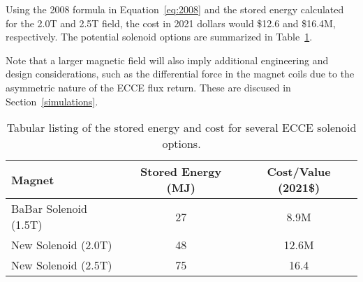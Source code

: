 Using the 2008 formula in Equation~\ref{eq:2008} and the stored energy calculated for the 2.0T and 2.5T field, the cost in 2021 dollars would \$12.6 and \$16.4M, respectively. The potential solenoid options are summarized in Table~\ref{tab:magoptions}. 

Note that a larger magnetic field will also imply additional engineering and design considerations, such as the differential force in the magnet coils due to the asymmetric nature of the ECCE flux return.  These are discused in Section~\ref{simulations}. 

\begin{table}[h!tbp]
    \centering
    \begin{tabular}{lcc}
        \hline
                     Magnet    & Stored Energy (MJ) &  Cost/Value (2021\$) \\ [0.5ex]
         \hline
         BaBar Solenoid (1.5T) & 27 & 8.9M \\       
         New Solenoid (2.0T)   & 48 & 12.6M \\
         New Solenoid (2.5T)   & 75 & 16.4 \\
         \hline
    \end{tabular}{}
     \caption{Tabular listing of the stored energy and cost for several ECCE solenoid options.}
    \label{tab:magoptions}
\end{table}


